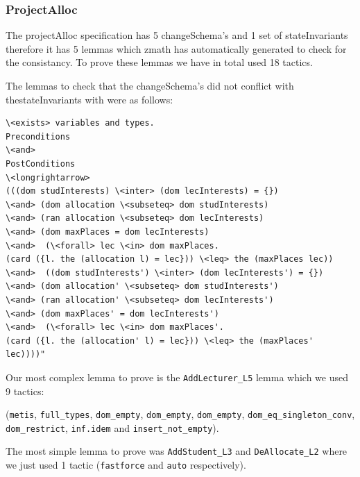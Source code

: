 \subsubsection{ProjectAlloc}

The projectAlloc specification has 5 changeSchema's and 1 set of stateInvariants therefore it has 5 lemmas which \gls{zmath} has automatically generated to check for the consistancy. To prove these lemmas we have in total used 18 tactics.

The lemmas to check that the changeSchema's did not conflict with thestateInvariants with were as follows:

\begin{verbatim}
\<exists> variables and types.
Preconditions
\<and>
PostConditions
\<longrightarrow>
(((dom studInterests) \<inter> (dom lecInterests) = {})
\<and> (dom allocation \<subseteq> dom studInterests)
\<and> (ran allocation \<subseteq> dom lecInterests)
\<and> (dom maxPlaces = dom lecInterests)
\<and>  (\<forall> lec \<in> dom maxPlaces.
(card ({l. the (allocation l) = lec})) \<leq> the (maxPlaces lec))
\<and>  ((dom studInterests') \<inter> (dom lecInterests') = {})
\<and> (dom allocation' \<subseteq> dom studInterests')
\<and> (ran allocation' \<subseteq> dom lecInterests')
\<and> (dom maxPlaces' = dom lecInterests')
\<and>  (\<forall> lec \<in> dom maxPlaces'.
(card ({l. the (allocation' l) = lec})) \<leq> the (maxPlaces' lec))))"
\end{verbatim}

Our most complex lemma to prove is the \verb|AddLecturer_L5| lemma which we used 9 tactics:

(\verb|metis|, \verb|full_types|, \verb|dom_empty|, \verb|dom_empty|, \verb|dom_empty|, \verb|dom_eq_singleton_conv|, \verb|dom_restrict|, \verb|inf.idem| and \verb|insert_not_empty|).

The most simple lemma to prove was \verb|AddStudent_L3| and \verb|DeAllocate_L2| where we just used 1 tactic (\verb|fastforce| and \verb|auto| respectively).

